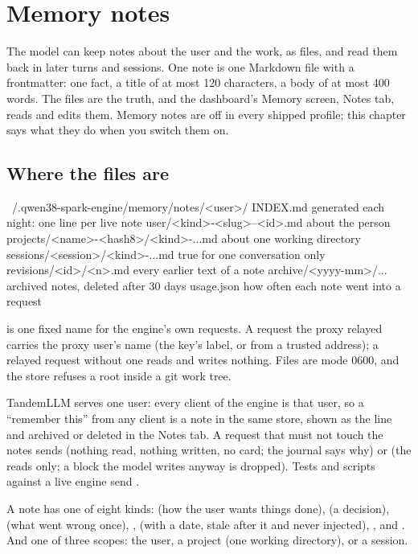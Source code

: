 \chapter{Memory notes}\label{ch:memory}

The model can keep notes about the user and the work, as files, and read them back in later turns and sessions. One note is one Markdown file with a frontmatter: one fact, a title of at most 120 characters, a body of at most 400 words. The files are the truth, and the dashboard's Memory screen, Notes tab, reads and edits them. Memory notes are off in every shipped profile; this chapter says what they do when you switch them on.

\section{Where the files are}

\begin{plain}
~/.qwen38-spark-engine/memory/notes/<user>/
  INDEX.md                               generated each night: one line per live note
  user/<kind>-<slug>--<id>.md            about the person
  projects/<name>-<hash8>/<kind>-...md   about one working directory
  sessions/<session>/<kind>-...md        true for one conversation only
  revisions/<id>/<n>.md                  every earlier text of a note
  archive/<yyyy-mm>/...                  archived notes, deleted after 30 days
  usage.json                             how often each note went into a request
\end{plain}

 is one fixed name for the engine's own requests. A request the proxy relayed carries the proxy user's name (the key's label, or  from a trusted address); a relayed request without one reads and writes nothing. Files are mode 0600, and the store refuses a root inside a git work tree.

TandemLLM serves one user: every client of the engine is that user, so a ``remember this'' from any client is a note in the same store, shown as the line  and archived or deleted in the Notes tab. A request that must not touch the notes sends  (nothing read, nothing written, no card; the journal says why) or  (the reads only; a block the model writes anyway is dropped). Tests and scripts against a live engine send .

A note has one of eight kinds:  (how the user wants things done),  (a decision),  (what went wrong once), ,  (with a  date, stale after it and never injected), ,  and . And one of three scopes: the user, a project (one working directory), or a session.

